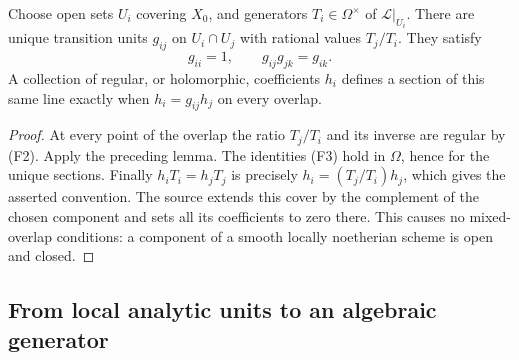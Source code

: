 \begin{srlemma}
\label{lem:faithful-line-transition-units}
Choose open sets \(U_i\) covering \(X_0\), and generators
\(T_i\in\Omega^\times\) of \(\mathcal L|_{U_i}\).
There are unique transition units \(g_{ij}\) on \(U_i\cap U_j\)
with rational values \(T_j/T_i\).  They satisfy
\[
                   g_{ii}=1,\qquad g_{ij}g_{jk}=g_{ik}.
 \tag{F3}\label{eq:faithful-line-cocycle}
\]
A collection of regular, or holomorphic, coefficients \(h_i\)
defines a section of this same line exactly when
\(h_i=g_{ij}h_j\) on every overlap.
\end{srlemma}
\begin{proof}
At every point of the overlap the ratio \(T_j/T_i\) and its inverse
are regular by (F2).  Apply the preceding lemma.
The identities (F3) hold in \(\Omega\), hence for the unique sections.
Finally \(h_iT_i=h_jT_j\) is precisely
\(h_i=(T_j/T_i)h_j\), which gives the asserted convention.
The source extends this cover by the complement of the chosen
component and sets all its coefficients to zero there.
This causes no mixed-overlap conditions: a component of a smooth
locally noetherian scheme is open and closed.
\end{proof}

\subsection{From local analytic units to an algebraic generator}

